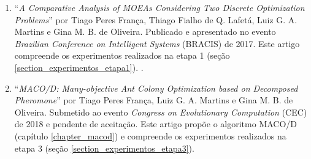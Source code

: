 \begin{enumerate}
	\item ``\textit{A Comparative Analysis of MOEAs Considering Two Discrete Optimization Problems}'' por Tiago Peres França, Thiago Fialho de Q. Lafetá, Luiz G. A. Martins e Gina M. B. de Oliveira. Publicado e apresentado no evento \textit{Brazilian Conference on Intelligent Systems} (BRACIS) de 2017. Este artigo compreende os experimentos realizados na etapa 1 (seção \ref{section_experimentos_etapa1}). \cite{Franca2017}.
	\item ``\textit{MACO/D: Many-objective Ant Colony Optimization based on Decomposed
		Pheromone}'' por Tiago Peres França, Luiz G. A. Martins e Gina M. B. de Oliveira. Submetido ao evento \textit{Congress on Evolutionary Computation} (CEC) de 2018 e pendente de aceitação. Este artigo propõe o algoritmo MACO/D (capítulo \ref{chapter_macod}) e compreende os experimentos realizados na etapa 3 (seção \ref{section_experimentos_etapa3}).
\end{enumerate}